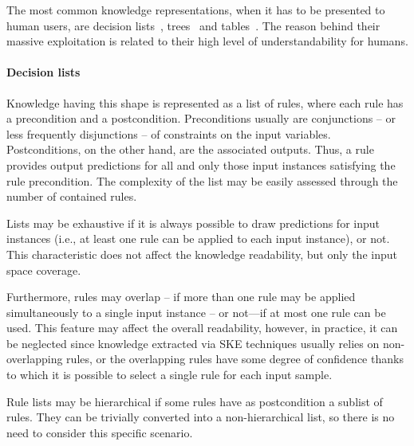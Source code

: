 \documentclass[sigconf]{acmart}
\begin{document}
The most common knowledge representations, when it has to be presented to human users, are decision lists~\cite{freitas2014comprehensible,huysmans2011empirical}, trees~\cite{quinlan1993c4,breiman1984classification} and tables~\cite{sethi2012kdruleex}.
%
The reason behind their massive exploitation is related to their high level of understandability for humans.

\paragraph{Decision lists}

Knowledge having this shape is represented as a list of rules, where each rule has a precondition and a postcondition.
%
Preconditions usually are conjunctions -- or less frequently disjunctions -- of constraints on the input variables.
%
Postconditions, on the other hand, are the associated outputs.
%
Thus, a rule provides output predictions for all and only those input instances satisfying the rule precondition.
%
The complexity of the list may be easily assessed through the number of contained rules.

Lists may be exhaustive if it is always possible to draw predictions for input instances (i.e., at least one rule can be applied to each input instance), or not.
%
This characteristic does not affect the knowledge readability, but only the input space coverage.

Furthermore, rules may overlap -- if more than one rule may be applied simultaneously to a single input instance -- or not---if at most one rule can be used.
%
This feature may affect the overall readability, however, in practice, it can be neglected since knowledge extracted via SKE techniques usually relies on non-overlapping rules, or the overlapping rules have some degree of confidence thanks to which it is possible to select a single rule for each input sample.

Rule lists may be hierarchical if some rules have as postcondition a sublist of rules.
%
They can be trivially converted into a non-hierarchical list, so there is no need to consider this specific scenario.
\end{document}
